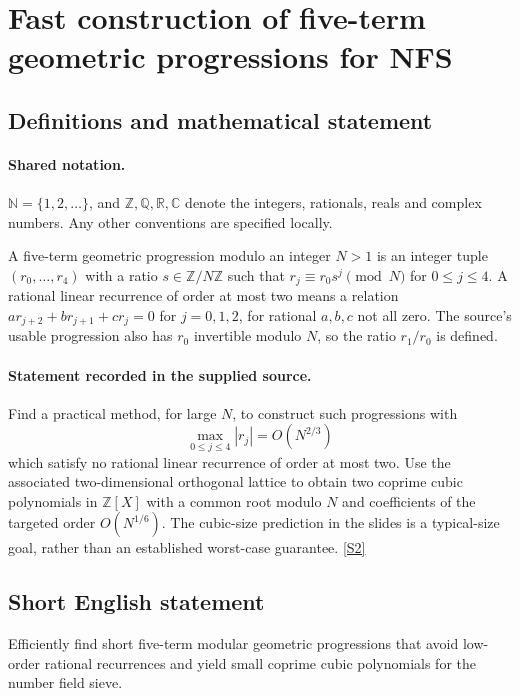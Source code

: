 \documentclass[11pt]{article}
\newcommand{\sref}[2]{\hyperlink{source:#1:#2}{[S#2]}}
\begin{document}
\section{Fast construction of five-term geometric progressions for NFS}\label{statement}

\subsection{Definitions and mathematical statement}

\paragraph{Shared notation.}$\mathbb N=\{1,2,\ldots\}$, and $\mathbb Z,\mathbb Q,\mathbb R,\mathbb C$ denote the integers, rationals, reals and complex numbers. Any other conventions are specified locally.


A five-term geometric progression modulo an integer $N>1$ is an integer tuple $(r_0,\ldots,r_4)$ with a ratio $s\in\mathbb Z/N\mathbb Z$ such that $r_j\equiv r_0s^j\pmod N$ for $0\le j\le4$. A rational linear recurrence of order at most two means a relation $a r_{j+2}+b r_{j+1}+c r_j=0$ for $j=0,1,2$, for rational $a,b,c$ not all zero. The source's usable progression also has $r_0$ invertible modulo $N$, so the ratio $r_1/r_0$ is defined.
\paragraph{Statement recorded in the supplied source.}
Find a practical method, for large $N$, to construct such progressions with
\[
\max_{0\le j\le4}|r_j|=O(N^{2/3})
\]
which satisfy no rational linear recurrence of order at most two. Use the associated two-dimensional orthogonal lattice to obtain two coprime cubic polynomials in $\mathbb Z[X]$ with a common root modulo $N$ and coefficients of the targeted order $O(N^{1/6})$. The cubic-size prediction in the slides is a typical-size goal, rather than an established worst-case guarantee. \sref{statement}{2}

\subsection{Short English statement}
Efficiently find short five-term modular geometric progressions that avoid low-order rational recurrences and yield small coprime cubic polynomials for the number field sieve.
\end{document}
